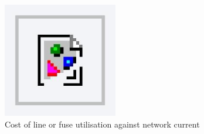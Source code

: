 \begin{figure}\centering
	\includegraphics[width=5cm]{foo}
	\caption{Cost of line or fuse utilisation against network current}
	\label{ch1:fig:fuse-utilisation}
\end{figure}